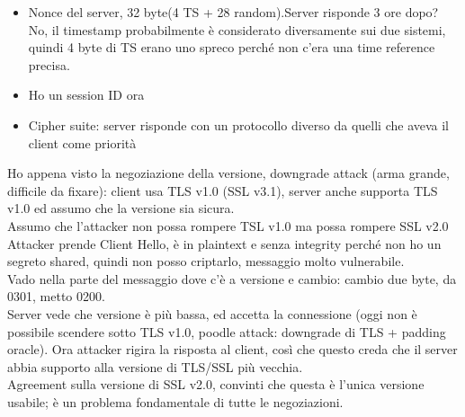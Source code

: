 \documentclass[16px]{article}
\begin{document}
\begin{itemize}
\begin{itemize}
\item Nonce del server, 32 byte(4 TS + 28 random).Server risponde 3 ore dopo? No, il timestamp probabilmente è considerato diversamente sui due sistemi, quindi 4 byte di TS erano uno spreco perché non c'era una time reference precisa.
\item Ho un session ID ora
\item Cipher suite: server risponde con un protocollo diverso da quelli che aveva il client come priorità
\end{itemize}
\end{itemize}
Ho appena visto la negoziazione della versione, downgrade attack (arma grande, difficile da fixare): client usa TLS v1.0 (SSL v3.1), server anche supporta TLS v1.0 ed assumo che la versione sia sicura.\\ Assumo che l'attacker non possa rompere TSL v1.0 ma possa rompere SSL v2.0\\ Attacker prende Client Hello, è in plaintext e senza integrity perché non ho un segreto shared, quindi non posso criptarlo, messaggio molto vulnerabile.\\ Vado nella parte del messaggio dove c'è a versione e cambio: cambio due byte, da 0301, metto 0200.\\ Server vede che versione è più bassa, ed accetta la connessione (oggi non è possibile scendere sotto TLS v1.0, poodle attack: downgrade di TLS + padding oracle). Ora attacker rigira la risposta al client, così che questo creda che il server abbia supporto alla versione di TLS/SSL più vecchia.\\ Agreement sulla versione di SSL v2.0, convinti che questa è l'unica versione usabile; è un problema fondamentale di tutte le negoziazioni.
\end{document}

